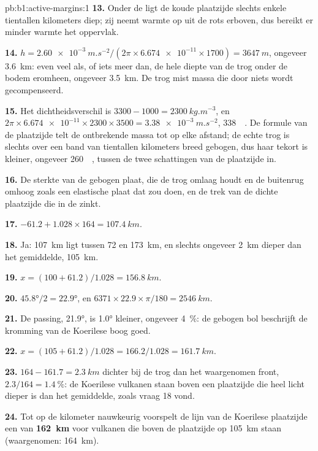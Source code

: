 \begin{solution}{pb:b1:active-margins:1}
\textbf{13.} Onder de  ligt de koude plaatzijde slechts enkele tientallen kilometers diep; zij neemt warmte op uit de rots erboven, dus bereikt er minder warmte het oppervlak.

\textbf{14.} $h = \qty{2.60e-3}{m.s^{-2}}/(2\pi\times\num{6.674e-11}\times1700)
= \qty{3647}{m}$, ongeveer \qty{3.6}{km}: even veel als, of iets meer dan, de
hele diepte van de trog onder de bodem eromheen, ongeveer \qty{3.5}{km}. De
trog mist massa die door niets wordt gecompenseerd.

\textbf{15.} Het dichtheidsverschil is $3300 - 1000 = \qty{2300}{kg.m^{-3}}$,
en $2\pi\times\num{6.674e-11}\times2300\times3500 = \qty{3.38e-3}{m.s^{-2}}$,
\qty{338}{\milli\gal}. De formule van de plaatzijde telt de ontbrekende massa tot op elke afstand; de echte trog is slechts over een band van tientallen kilometers breed gebogen, dus haar tekort is kleiner, ongeveer \qty{260}{\milli\gal}, tussen de twee schattingen van de plaatzijde in.

\textbf{16.} De sterkte van de gebogen plaat, die de trog omlaag houdt en de buitenrug omhoog zoals een elastische plaat dat zou doen, en de trek van de dichte plaatzijde die in de  zinkt.

\textbf{17.} $-61.2 + 1.028\times164 = \qty{107.4}{km}$.

\textbf{18.} Ja: \qty{107}{km} ligt tussen 72 en \qty{173}{km}, en slechts
ongeveer \qty{2}{km} dieper dan het gemiddelde, \qty{105}{km}.

\textbf{19.} $x = (100 + 61.2)/1.028 = \qty{156.8}{km}$.

\textbf{20.} $\ang{45.8}/2 = \ang{22.9}$, en
$6371\times22.9\times\pi/180 = \qty{2546}{km}$.

\textbf{21.} De passing, \ang{21.9}, is \ang{1.0} kleiner, ongeveer
\qty{4}{\percent}: de gebogen bol beschrijft de kromming van de Koerilese boog goed.

\textbf{22.} $x = (105 + 61.2)/1.028 = 166.2/1.028 = \qty{161.7}{km}$.

\textbf{23.} $164 - 161.7 = \qty{2.3}{km}$ dichter bij de trog dan het waargenomen
front, $2.3/164 = \qty{1.4}{\percent}$: de Koerilese vulkanen staan boven een plaatzijde die heel licht dieper is dan het gemiddelde, zoals vraag 18 vond.

\textbf{24.} Tot op de kilometer nauwkeurig voorspelt de lijn van de Koerilese plaatzijde een
 van \textbf{\qty[text-series-to-math=true]{162}{km}} voor
vulkanen die boven de plaatzijde op \qty{105}{km} staan (waargenomen: \qty{164}{km}).
\end{solution}
